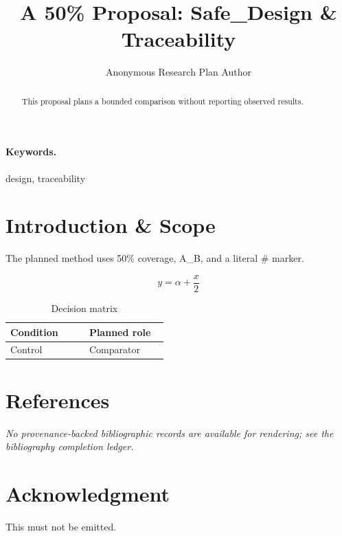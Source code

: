 \documentclass{article}
\title{A 50\% Proposal: Safe\_Design \& Traceability}
\author{Anonymous Research Plan Author}
\begin{document}
\maketitle
\begin{abstract}
This proposal plans a bounded comparison without reporting observed results.
\end{abstract}
\paragraph{Keywords.} design, traceability
\section{Introduction \& Scope}
The planned method uses 50\% coverage, A\_B, and a literal \# marker.

\begin{equation}
y = \alpha + \frac{x}{2}
\label{eq:introduction-B2}
\end{equation}

\begin{table}[htbp]
\centering
\small


\caption{Decision matrix}
\label{tab:introduction-B3}
\begin{tabular}{|p{0.45\linewidth}|p{0.45\linewidth}|}
\hline
Condition & Planned role \\\hline
Control & Comparator \\\hline
\end{tabular}
\end{table}
\section*{References}
\emph{No provenance-backed bibliographic records are available for rendering; see the bibliography completion ledger.}
\section*{Acknowledgment}
This must not be emitted.
\end{document}
